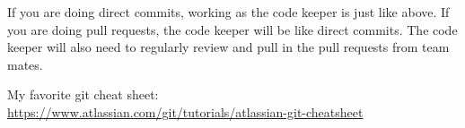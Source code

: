 \documentclass[11pt]{article}
\begin{document}
If you are doing direct commits, working as the code keeper is just like above.  If you are doing pull requests, the code keeper will be like direct commits.  The code keeper will also need to regularly review and pull in the pull requests from team mates.

My favorite git cheat sheet:\\
\url{https://www.atlassian.com/git/tutorials/atlassian-git-cheatsheet}
\end{document}
